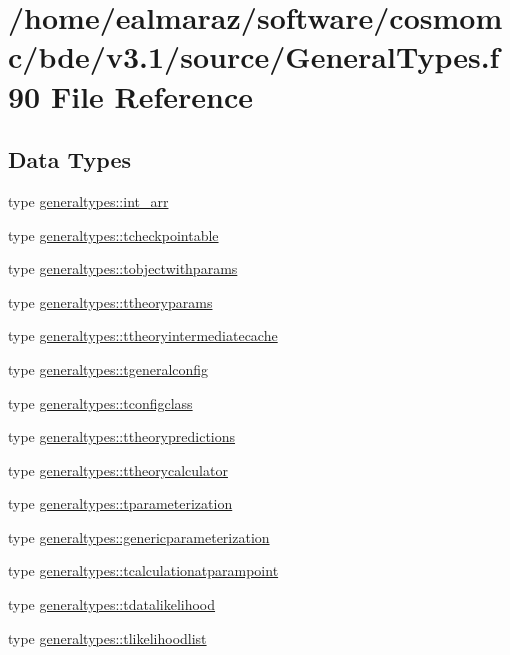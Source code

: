 \hypertarget{GeneralTypes_8f90}{}\section{/home/ealmaraz/software/cosmomc/bde/v3.1/source/\+General\+Types.f90 File Reference}
\label{GeneralTypes_8f90}
\subsection*{Data Types}
\begin{DoxyCompactItemize}
\item 
type \mbox{\hyperlink{structgeneraltypes_1_1int__arr}{generaltypes\+::int\+\_\+arr}}
\item 
type \mbox{\hyperlink{structgeneraltypes_1_1tcheckpointable}{generaltypes\+::tcheckpointable}}
\item 
type \mbox{\hyperlink{structgeneraltypes_1_1tobjectwithparams}{generaltypes\+::tobjectwithparams}}
\item 
type \mbox{\hyperlink{structgeneraltypes_1_1ttheoryparams}{generaltypes\+::ttheoryparams}}
\item 
type \mbox{\hyperlink{structgeneraltypes_1_1ttheoryintermediatecache}{generaltypes\+::ttheoryintermediatecache}}
\item 
type \mbox{\hyperlink{structgeneraltypes_1_1tgeneralconfig}{generaltypes\+::tgeneralconfig}}
\item 
type \mbox{\hyperlink{structgeneraltypes_1_1tconfigclass}{generaltypes\+::tconfigclass}}
\item 
type \mbox{\hyperlink{structgeneraltypes_1_1ttheorypredictions}{generaltypes\+::ttheorypredictions}}
\item 
type \mbox{\hyperlink{structgeneraltypes_1_1ttheorycalculator}{generaltypes\+::ttheorycalculator}}
\item 
type \mbox{\hyperlink{structgeneraltypes_1_1tparameterization}{generaltypes\+::tparameterization}}
\item 
type \mbox{\hyperlink{structgeneraltypes_1_1genericparameterization}{generaltypes\+::genericparameterization}}
\item 
type \mbox{\hyperlink{structgeneraltypes_1_1tcalculationatparampoint}{generaltypes\+::tcalculationatparampoint}}
\item 
type \mbox{\hyperlink{structgeneraltypes_1_1tdatalikelihood}{generaltypes\+::tdatalikelihood}}
\item 
type \mbox{\hyperlink{structgeneraltypes_1_1tlikelihoodlist}{generaltypes\+::tlikelihoodlist}}
\end{DoxyCompactItemize}
